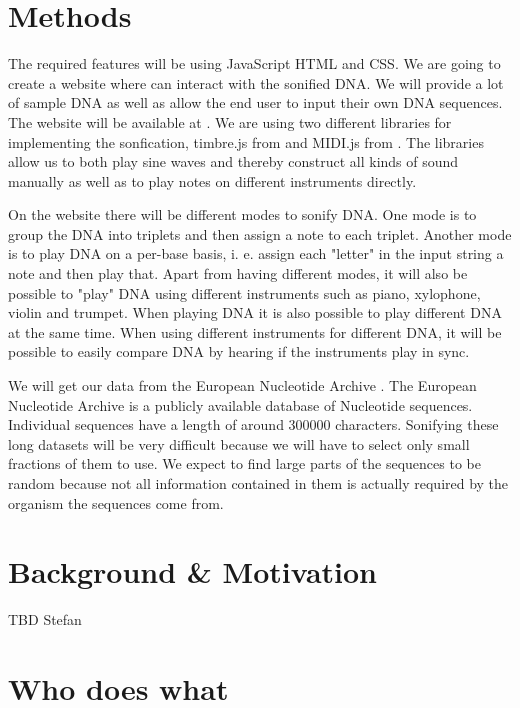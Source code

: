 \documentclass[12pt]{article}
\begin{document}
\section{Methods}

The required features will be using JavaScript HTML and CSS. We are going to create a website where can interact with the sonified DNA. We will provide a lot of sample DNA as well as allow the end user to input their own DNA sequences. The website will be available at \cite{site:letthednaspeak}. We are using two different libraries for implementing the sonfication, timbre.js from \cite{libs:timbrejs} and MIDI.js from \cite{libs:midijs}. The libraries allow us to both play sine waves and thereby construct all kinds of sound manually as well as to play notes on different instruments directly. 

On the website there will be different modes to sonify DNA. One mode is to group the DNA into triplets and then assign a note to each triplet. Another mode is to play DNA on a per-base basis, i. e. assign each "letter" in the input string a note and then play that. Apart from having different modes, it will also be possible to "play" DNA using different instruments such as piano, xylophone, violin and trumpet. When playing DNA it is also possible to play different DNA at the same time. When using different instruments for different DNA, it will be possible to easily compare DNA by hearing if the instruments play in sync. 

We will get our data from the European Nucleotide Archive \cite{site:ena}. The European Nucleotide Archive is a publicly available database of Nucleotide sequences. Individual sequences have a length of around 300000 characters. Sonifying these long datasets will be very difficult because we will have to select only small fractions of them to use. We expect to find large parts of the sequences to be random because not all information contained in them is actually required by the organism the sequences come from.  

\section{Background \& Motivation}

TBD Stefan

\section{Who does what}
\end{document}
